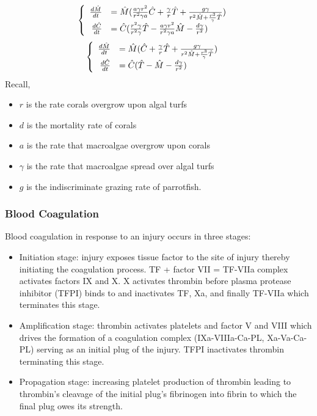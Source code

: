 \begin{frame}$$\begin{cases}
\begin{array}{rl}
\frac{d\HAT{M}}{dt}&= \HAT{M}(\frac{a\gamma r^2}{r^2\gamma a}\HAT{C}+\frac{\gamma}{r}\HAT{T}+\frac{g\gamma}{r^2\HAT{M}+ \frac{r^3}{\gamma}\HAT{T}}) \\ 
\frac{d\HAT{C}}{dt}&=\HAT{C}(\frac{r^2\gamma}{r^2\gamma}\HAT{T}-\frac{a\gamma r^2}{r^2\gamma a}\HAT{M}-\frac{d\gamma}{r^2})
\end{array} \end{cases}$$$$\begin{cases}
\begin{array}{rl}
\frac{d\HAT{M}}{dt}&= \HAT{M}(\HAT{C}+\frac{\gamma}{r}\HAT{T}+\frac{g\gamma}{r^2\HAT{M}+ \frac{r^3}{\gamma}\HAT{T}}) \\ 
\frac{d\HAT{C}}{dt}&=\HAT{C}(\HAT{T}-\HAT{M}-\frac{d\gamma}{r^2})
\end{array} \end{cases}$$ Recall, \begin{itemize}\itemsep0pt
\item $r$ is the rate corals overgrow upon algal turfs\\
\item $d$ is the mortality rate of corals\\
\item $a$ is the rate that macroalgae overgrow upon corals\\
\item $\gamma$ is the rate that macroalgae spread over algal turfs\\
\item $g$ is the indiscriminate grazing rate of parrotfish.
\end{itemize}
\end{frame}

\begin{frame}
  \frametitle{Blood Coagulation}
  Blood coagulation in response to an injury occurs in three stages: \begin{itemize}
  \item Initiation stage: injury exposes tissue factor to the site of injury thereby initiating the coagulation process. TF + factor VII = TF-VIIa complex activates factors IX and X. X activates thrombin before plasma protease inhibitor (TFPI) binds to and inactivates TF, Xa, and finally TF-VIIa which terminates this stage.\\
  \item Amplification stage: thrombin activates platelets and factor V and VIII which drives the formation of a coagulation complex (IXa-VIIIa-Ca-PL, Xa-Va-Ca-PL) serving as an initial plug of the injury. TFPI inactivates thrombin terminating this stage.\\
  \item Propagation stage: increasing platelet production of thrombin leading to thrombin's cleavage of the initial plug's fibrinogen into fibrin to which the final plug owes its strength.
  \end{itemize}
\end{frame}

